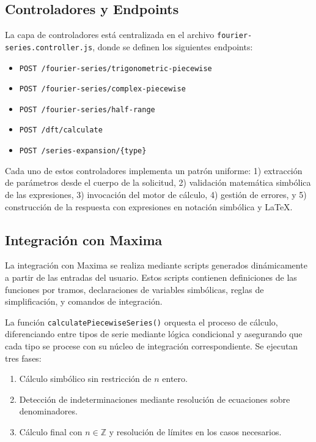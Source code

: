 \subsection{Controladores y Endpoints}

La capa de controladores está centralizada en el archivo \texttt{fourier-series.controller.js}, donde se definen los siguientes endpoints:

\begin{itemize}
	\item \texttt{POST /fourier-series/trigonometric-piecewise}
	\item \texttt{POST /fourier-series/complex-piecewise}
	\item \texttt{POST /fourier-series/half-range}
	\item \texttt{POST /dft/calculate}
	\item \texttt{POST /series-expansion/\{type\}}
\end{itemize}

Cada uno de estos controladores implementa un patrón uniforme: 
1) extracción de parámetros desde el cuerpo de la solicitud, 
2) validación matemática simbólica de las expresiones, 
3) invocación del motor de cálculo, 
4) gestión de errores, y 
5) construcción de la respuesta con expresiones en notación simbólica y LaTeX.

\subsection{Integración con Maxima}

La integración con Maxima se realiza mediante scripts generados dinámicamente a partir de las entradas del usuario. Estos scripts contienen definiciones de las funciones por tramos, declaraciones de variables simbólicas, reglas de simplificación, y comandos de integración.

La función \texttt{calculatePiecewiseSeries()} orquesta el proceso de cálculo, diferenciando entre tipos de serie mediante lógica condicional y asegurando que cada tipo se procese con su núcleo de integración correspondiente. Se ejecutan tres fases:
\begin{enumerate}
	\item Cálculo simbólico sin restricción de $n$ entero.
	\item Detección de indeterminaciones mediante resolución de ecuaciones sobre denominadores.
	\item Cálculo final con $n \in \mathbb{Z}$ y resolución de límites en los casos necesarios.
\end{enumerate}

